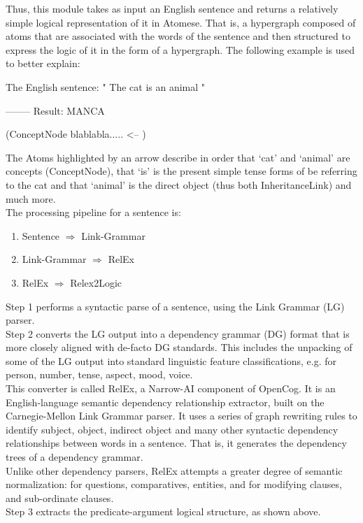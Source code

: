 Thus, this module takes as input an English sentence and returns a relatively simple logical representation of it in Atomese. That is, a hypergraph composed of atoms that are associated with the words of the sentence and then structured to express the logic of it in the form of a hypergraph. The following example is used to better explain: \\
\begin{python}
	The English sentence: " The cat is an animal "

	-------- Result:
	MANCA 

	(ConceptNode blablabla.....	<--
	)
\end{python}

The Atoms highlighted by an arrow describe in order that `cat' and `animal' are concepts (ConceptNode), that `is' is the present simple tense forms of be referring to the cat and that `animal' is the direct object (thus both InheritanceLink) and much more. \\

The processing pipeline for a sentence is: 
\begin{enumerate}
	\item Sentence $\Rightarrow$ Link-Grammar
	\item Link-Grammar $\Rightarrow$ RelEx
	\item RelEx $\Rightarrow$ Relex2Logic
\end{enumerate}

Step 1 performs a syntactic parse of a sentence, using the Link Grammar (LG) parser. \\

Step 2 converts the LG output into a dependency grammar (DG) format that is more closely aligned with de-facto DG standards. This includes the unpacking of some of the LG output into standard linguistic feature classifications, e.g. for person, number, tense, aspect, mood, voice. \\
This converter is called RelEx, a Narrow-AI component of OpenCog. It is an English-language semantic dependency relationship extractor, built on the Carnegie-Mellon Link Grammar parser. It uses a series of graph rewriting rules to identify subject, object, indirect object and many other syntactic dependency relationships between words in a sentence. That is, it generates the dependency trees of a dependency grammar. \\
Unlike other dependency parsers, RelEx attempts a greater degree of semantic normalization: for questions, comparatives, entities, and for modifying clauses, and sub-ordinate clauses. \\

Step 3 extracts the predicate-argument logical structure, as shown above.

